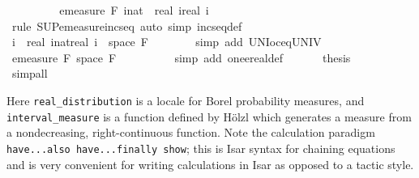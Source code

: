 \documentclass[leqno]{article}
\theoremstyle{definition}
\begin{document}
\begin{isabellebody}
\ \ \ \ \isamarkupfalse%
\ \isamarkupfalse%
\ {\isachardoublequoteopen}{\isasymdots}\ {\isacharequal}\ emeasure\ {\isacharquery}F\ {\isacharparenleft}{\isasymUnion}i{\isacharcolon}{\isacharcolon}nat{\isachardot}\ {\isacharbraceleft}{\isacharminus}\ real\ i{\isacharless}{\isachardot}{\isachardot}real\ i{\isacharbraceright}{\isacharparenright}{\isachardoublequoteclose}\isanewline
\ \ \ \ \ \ \isamarkupfalse%
\ {\isacharparenleft}rule\ SUP{\isacharunderscore}emeasure{\isacharunderscore}incseq{\isacharparenright}\ {\isacharparenleft}auto\ simp{\isacharcolon}\ incseq{\isacharunderscore}def{\isacharparenright}\isanewline
\ \ \ \ \isamarkupfalse%
\ \isamarkupfalse%
\ {\isachardoublequoteopen}{\isacharparenleft}{\isasymUnion}i{\isachardot}\ {\isacharbraceleft}{\isacharminus}\ real\ {\isacharparenleft}i{\isacharcolon}{\isacharcolon}nat{\isacharparenright}{\isacharless}{\isachardot}{\isachardot}real\ i{\isacharbraceright}{\isacharparenright}\ {\isacharequal}\ space\ {\isacharquery}F{\isachardoublequoteclose}\isanewline
\ \ \ \ \ \ \isamarkupfalse%
\ {\isacharparenleft}simp\ add{\isacharcolon}\ UN{\isacharunderscore}Ioc{\isacharunderscore}eq{\isacharunderscore}UNIV{\isacharparenright}\isanewline
\ \ \ \ \isamarkupfalse%
\ \isamarkupfalse%
\ {\isachardoublequoteopen}emeasure\ {\isacharquery}F\ {\isacharparenleft}space\ {\isacharquery}F{\isacharparenright}\ {\isacharequal}\ {}{\isachardoublequoteclose}\isanewline
\ \ \ \ \ \ \isamarkupfalse%
\ {\isacharparenleft}simp\ add{\isacharcolon}\ one{\isacharunderscore}ereal{\isacharunderscore}def{\isacharparenright}\isanewline
\ \ \isamarkupfalse%
\isanewline
\ \ \isamarkupfalse%
\ {\isacharquery}thesis\isanewline
\ \ \ \ \isamarkupfalse%
\ \isamarkupfalse%
\ simp{\isacharunderscore}all\isanewline
{}\isamarkupfalse%
\end{isabellebody}

\medskip

Here \texttt{real\_distribution} is a locale for Borel probability measures, and \texttt{interval\_measure} is a function defined by H\"olzl which generates a measure from a nondecreasing, right-continuous function. Note the calculation paradigm \texttt{have...also have...finally show}; this is Isar syntax for chaining equations and is very convenient for writing calculations in Isar as opposed to a tactic style.
\end{document}

